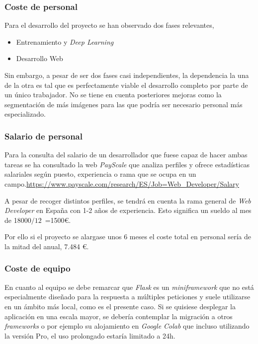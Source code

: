 \subsubsection{Coste de personal}
Para el desarrollo del proyecto se han observado dos fases relevantes, 
\begin{itemize}
    \item Entrenamiento y \emph{Deep Learning}
    \item Desarrollo Web
\end{itemize}
Sin embargo, a pesar de ser dos fases casi independientes, la dependencia la una de la otra es tal que es perfectamente viable el desarrollo completo por parte de un único trabajador. No se tiene en cuenta posteriores mejoras como la segmentación de más imágenes para las que podría ser necesario personal más especializado.

\subsubsection{Salario de personal}
Para la consulta del salario de un desarrollador que fuese capaz de hacer ambas tareas se ha consultado la web \emph{PayScale} que analiza perfiles y ofrece estadísticas salariales según puesto, experiencia o rama que se ocupa en un campo.\url{https://www.payscale.com/research/ES/Job=Web_Developer/Salary}

A pesar de recoger distintos perfiles, se tendrá en cuenta la rama general de \emph{Web Developer} en España con 1-2 años de experiencia. 
Esto significa un sueldo al mes de 18000\(/12\)\ =1500\euro.


Por ello si el proyecto se alargase unos 6 meses el coste total en personal sería de la mitad del anual, 7.484 \euro.

\subsubsection{Coste de equipo}
En cuanto al equipo se debe remarcar que \emph{Flask} es un \emph{miniframework} que no está especialmente diseñado para la respuesta a múltiples peticiones y suele utilizarse en un ámbito más local, como es el presente caso.
Si se quisiese desplegar la aplicación en una escala mayor, se debería contemplar la migración a otros \emph{frameworks} o por ejemplo su alojamiento en \emph{Google Colab} que incluso utilizando la versión Pro, el uso prolongado estaría limitado a 24h.

